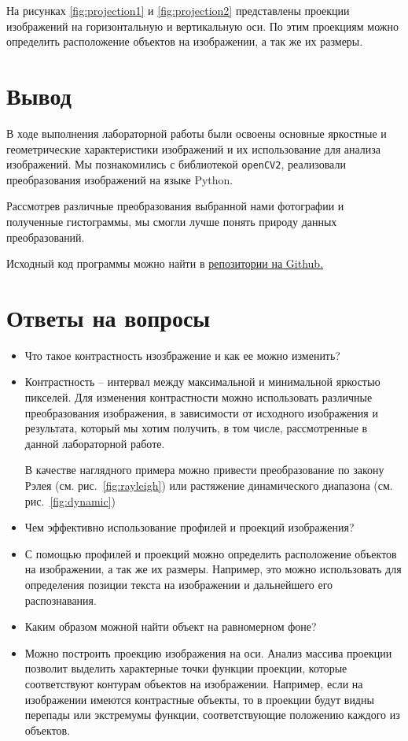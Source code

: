 На рисунках \ref{fig:projection1} и \ref{fig:projection2} представлены проекции изображений на горизонтальную и вертикальную оси. 
По этим проекциям можно определить расположение объектов на изображении, а так же их размеры.

\newpage\clearpage
\section{Вывод}

В ходе выполнения лабораторной работы были освоены основные яркостные и геометрические
характеристики изображений и их использование для анализа изображений. 
Мы познакомились с библиотекой \texttt{openCV2}, реализовали преобразования изображений на языке Python. 

Рассмотрев различные преобразования выбранной нами фотографии и полученные гистограммы, мы смогли лучше понять природу данных преобразований. 



Исходный код программы можно найти в \href{https://github.com/edelwiw/TechVision_Lab1}{репозитории на Github.}

\section{Ответы на вопросы}

\setcounter{question}{0}

\newcommand{\question}[1]{\item[Q\refstepcounter{question}\thequestion.] #1}
\newcommand{\answer}[1]{\item[A\thequestion.] #1}

\begin{itemize}

\question{Что такое контрастность изозбражение и как ее можно изменить?}
\answer{Контрастность -- интервал между максимальной и минимальной яркостью пикселей. 
Для изменения контрастности можно использовать различные преобразования изображения, 
в зависимости от исходного изображения и результата, который мы хотим получить,
в том числе, рассмотренные в данной лабораторной работе.

В качестве наглядного примера можно привести преобразование по закону Рэлея (см. рис.~\ref{fig:rayleigh}) или растяжение динамического диапазона (см. рис.~\ref{fig:dynamic})
}
\question{Чем эффективно использование профилей и проекций изображения?}
\answer{С помощью профилей и проекций можно определить расположение объектов на изображении, 
а так же их размеры. Например, это можно использовать для определения позиции текста на изображении и 
дальнейшего его распознавания.}

\question{Каким образом можной найти объект на равномерном фоне?}
\answer{Можно построить проекцию изображения на оси. Анализ массива проекции позволит выделить
характерные точки функции проекции, которые соответствуют контурам объектов на изображении. 
Например, если на изображении имеются контрастные объекты, то в проекции будут видны 
перепады или экстремумы функции, соответствующие положению каждого из объектов.}

\end{itemize}



